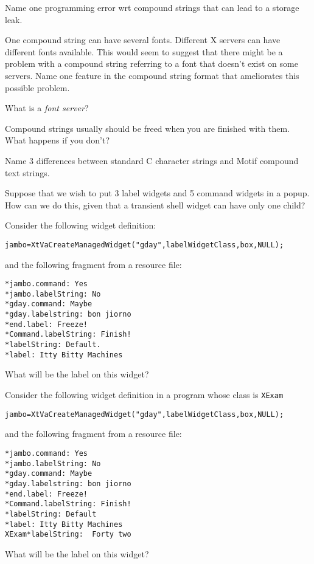 \documentclass[twoside]{article}
\begin{document}
\begin{enumerate}
Name one programming error wrt compound strings that can lead
to a storage leak.


One compound string can have several fonts.  Different X servers
can have different fonts available.  This would seem to suggest
that there might be a problem with a compound string referring to
a font that doesn't exist on some servers.  Name one feature in
the compound string format that ameliorates this possible problem.


 What is a \emph{font server}?


 Compound strings usually should be freed when you are
finished with them.  What happens if you don't?


 Name 3 differences between standard C character strings
and Motif compound text strings.


 Suppose that we wish to put 3 label widgets and 5 command
widgets in a popup.  How can we do this, given that a transient shell
widget can have only one child?


 Consider the following widget definition:
\begin{verbatim}
jambo=XtVaCreateManagedWidget("gday",labelWidgetClass,box,NULL);
\end{verbatim}
and the following fragment from a resource file:
\begin{verbatim}
*jambo.command: Yes
*jambo.labelString: No
*gday.command: Maybe
*gday.labelstring: bon jiorno
*end.label: Freeze!
*Command.labelString: Finish!
*labelString: Default.
*label: Itty Bitty Machines
\end{verbatim}

What will be the label on this widget?


 Consider the following widget definition in a program
whose class is \texttt{XExam}
\begin{verbatim}
jambo=XtVaCreateManagedWidget("gday",labelWidgetClass,box,NULL);
\end{verbatim}
and the following fragment from a resource file:
\begin{verbatim}
*jambo.command: Yes
*jambo.labelString: No
*gday.command: Maybe
*gday.labelstring: bon jiorno
*end.label: Freeze!
*Command.labelString: Finish!
*labelString: Default
*label: Itty Bitty Machines
XExam*labelString:  Forty two
\end{verbatim}

What will be the label on this widget?



\end{enumerate}
\end{document}
